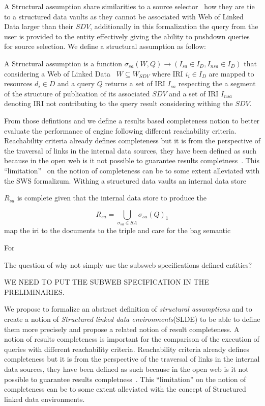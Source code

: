 A Structural assumption share similarities to a source selector~\cite{Bogaerts2021LinkTW} how they are tie to a structured data vaults as they cannot be associated with 
Web of Linked Data larger than their $SDV$, additionally in this formalization the query from the user is provided to the entity effectively giving the ability to 
pushdown queries for source selection. We define a structural assumption as follow:

\begin{definition}\label{def:structuralAssumption}
A Structural assumption is a function $\sigma_{sa}(W,Q) \rightarrow (I_{sa}\in I_D, I_{nsa} \in I_D)$ that considering a Web of Linked Data~\cite{Bogaerts2021LinkTW} $W \subseteq W_{SDV}$ 
where IRI $i_i \in I_D$ are mapped to resources $d_i \in D$ and a query $Q$ returns a set of IRI $I_{sa}$ respecting the a segment of the structure of publication of 
its associated $SDV$ and a set of IRI $I_{nsa}$ denoting IRI not contributing to the query result considering withing the $SDV$.
\end{definition}

From those defintions and we define a results based completeness notion to better evaluate the performance of engine following different reachability criteria.
Reachability criteria already defines completeness but it is from the perspective of the traversal of links in the internal data sources,
they have been defined as such because in the open web is it not possible to guarantee results completness~\cite{Hartig2012}.
This ``limitation''~\cite{Hartig2012} on the notion of completeness can be to some extent alleviated with the SWS formalizum.
Withing a structured data vaults an internal data store 

$R_{sa}$ is complete given that the internal data store to produce the  

\begin{equation}
   R_{sa} = \bigcup_{\sigma_{sa} \in SA} \sigma_{sa}(Q)_1 
\end{equation}
map the iri to the documents to the triple and care for the bag semantic


For 

The question of why not simply use the subsweb specifications defined entities?

WE NEED TO PUT THE SUBWEB SPECIFICATION IN THE PRELIMINARIES.

\iffalse
We propose to formalize an abstract definition of \emph{structural assumptions} and to create a notion of \emph{Structured linked data environments}(SLDE)
to be able to define them more precisely and propose a related notion of result completeness.
A notion of results completeness is important for the comparison of the execution of queries with different reachability criteria.
Reachability criteria already defines completeness but it is from the perspective of the traversal of links in the internal data sources,
they have been defined as such because in the open web is it not possible to guarantee results completness~\cite{Hartig2012}.
This ``limitation'' on the notion of completeness can be to some extent alleviated with the concept of Structured linked data environments.


